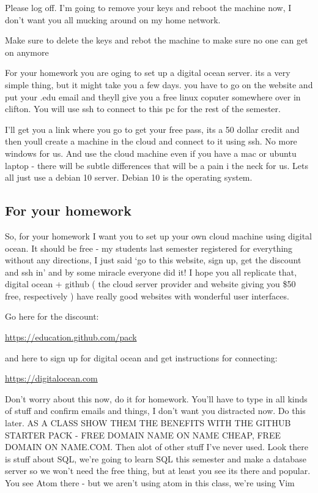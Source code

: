 \documentclass[10pt]{article}
\begin{document}
Please log off. I'm going to remove your keys and reboot the machine now, I
don't want you all mucking around on my home network.

{\LARGE Make sure to delete the keys and rebot the machine to make sure no one
can get on anymore}

For your homework you are oging to set up a digital ocean server. its a very
simple thing, but it might take you a few days. you have to go on the website
and put your .edu email and theyll give you a free linux coputer somewhere over
in clifton. You will use ssh to connect to this pc for the rest of the semester.

I'll get you a link where you go to get your free pass, its a 50 dollar credit
and then youll create a machine in the cloud and connect to it using ssh. No
more windows for us. And use the cloud machine even if you have a mac or ubuntu
laptop - there will be subtle differences that will be a pain i the neck for us.
Lets all just use a debian 10 server. Debian 10 is the operating system.


\subsection{For your homework}

So, for your homework I want you to set up your own cloud machine using digital
ocean. It should be free - my students last semester registered for everything
without any directions, I just said `go to this website, sign up, get the
discount and ssh in' and by some miracle everyone did it! I hope you all
replicate that, digital ocean + github ( the cloud server provider and website
giving you \$50 free, respectively ) have really good websites  with wonderful
user interfaces.

Go here for the discount:

\url{https://education.github.com/pack}

and here to sign up for digital ocean and get instructions for connecting:

\url{https://digitalocean.com}

{\LARGE Don't worry about this now, do it for homework. You'll have to type in
all kinds of stuff and confirm emails and things, I don't want you distracted
now. Do this later. AS A CLASS SHOW THEM THE BENEFITS WITH THE GITHUB STARTER
PACK - FREE DOMAIN NAME ON NAME CHEAP, FREE DOMAIN ON NAME.COM. Then alot of
other stuff I've never used. Look there is stuff about SQL, we're going to learn
SQL this semester and make a database server so we won't need the free thing,
but at least you see its there and popular. You see Atom there - but we aren't
using atom in this class, we're using Vim}
\end{document}
